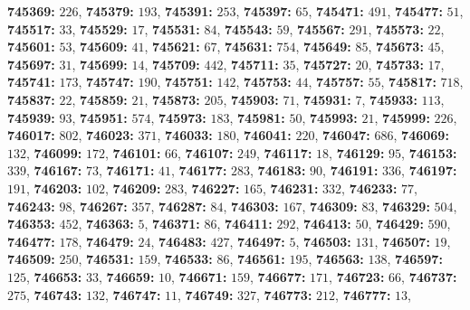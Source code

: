 \textsf{\bfseries 745369:} $226$, \textsf{\bfseries 745379:} $193$, \textsf{\bfseries 745391:} $253$, \textsf{\bfseries 745397:} $65$, \textsf{\bfseries 745471:} $491$, \textsf{\bfseries 745477:} $51$, \textsf{\bfseries 745517:} $33$, \textsf{\bfseries 745529:} $17$, \textsf{\bfseries 745531:} $84$, \textsf{\bfseries 745543:} $59$, \textsf{\bfseries 745567:} $291$, \textsf{\bfseries 745573:} $22$, \textsf{\bfseries 745601:} $53$, \textsf{\bfseries 745609:} $41$, \textsf{\bfseries 745621:} $67$, \textsf{\bfseries 745631:} $754$, \textsf{\bfseries 745649:} $85$, \textsf{\bfseries 745673:} $45$, \textsf{\bfseries 745697:} $31$, \textsf{\bfseries 745699:} $14$, \textsf{\bfseries 745709:} $442$, \textsf{\bfseries 745711:} $35$, \textsf{\bfseries 745727:} $20$, \textsf{\bfseries 745733:} $17$, \textsf{\bfseries 745741:} $173$, \textsf{\bfseries 745747:} $190$, \textsf{\bfseries 745751:} $142$, \textsf{\bfseries 745753:} $44$, \textsf{\bfseries 745757:} $55$, \textsf{\bfseries 745817:} $718$, \textsf{\bfseries 745837:} $22$, \textsf{\bfseries 745859:} $21$, \textsf{\bfseries 745873:} $205$, \textsf{\bfseries 745903:} $71$, \textsf{\bfseries 745931:} $7$, \textsf{\bfseries 745933:} $113$, \textsf{\bfseries 745939:} $93$, \textsf{\bfseries 745951:} $574$, \textsf{\bfseries 745973:} $183$, \textsf{\bfseries 745981:} $50$, \textsf{\bfseries 745993:} $21$, \textsf{\bfseries 745999:} $226$, \textsf{\bfseries 746017:} $802$, \textsf{\bfseries 746023:} $371$, \textsf{\bfseries 746033:} $180$, \textsf{\bfseries 746041:} $220$, \textsf{\bfseries 746047:} $686$, \textsf{\bfseries 746069:} $132$, \textsf{\bfseries 746099:} $172$, \textsf{\bfseries 746101:} $66$, \textsf{\bfseries 746107:} $249$, \textsf{\bfseries 746117:} $18$, \textsf{\bfseries 746129:} $95$, \textsf{\bfseries 746153:} $339$, \textsf{\bfseries 746167:} $73$, \textsf{\bfseries 746171:} $41$, \textsf{\bfseries 746177:} $283$, \textsf{\bfseries 746183:} $90$, \textsf{\bfseries 746191:} $336$, \textsf{\bfseries 746197:} $191$, \textsf{\bfseries 746203:} $102$, \textsf{\bfseries 746209:} $283$, \textsf{\bfseries 746227:} $165$, \textsf{\bfseries 746231:} $332$, \textsf{\bfseries 746233:} $77$, \textsf{\bfseries 746243:} $98$, \textsf{\bfseries 746267:} $357$, \textsf{\bfseries 746287:} $84$, \textsf{\bfseries 746303:} $167$, \textsf{\bfseries 746309:} $83$, \textsf{\bfseries 746329:} $504$, \textsf{\bfseries 746353:} $452$, \textsf{\bfseries 746363:} $5$, \textsf{\bfseries 746371:} $86$, \textsf{\bfseries 746411:} $292$, \textsf{\bfseries 746413:} $50$, \textsf{\bfseries 746429:} $590$, \textsf{\bfseries 746477:} $178$, \textsf{\bfseries 746479:} $24$, \textsf{\bfseries 746483:} $427$, \textsf{\bfseries 746497:} $5$, \textsf{\bfseries 746503:} $131$, \textsf{\bfseries 746507:} $19$, \textsf{\bfseries 746509:} $250$, \textsf{\bfseries 746531:} $159$, \textsf{\bfseries 746533:} $86$, \textsf{\bfseries 746561:} $195$, \textsf{\bfseries 746563:} $138$, \textsf{\bfseries 746597:} $125$, \textsf{\bfseries 746653:} $33$, \textsf{\bfseries 746659:} $10$, \textsf{\bfseries 746671:} $159$, \textsf{\bfseries 746677:} $171$, \textsf{\bfseries 746723:} $66$, \textsf{\bfseries 746737:} $275$, \textsf{\bfseries 746743:} $132$, \textsf{\bfseries 746747:} $11$, \textsf{\bfseries 746749:} $327$, \textsf{\bfseries 746773:} $212$, \textsf{\bfseries 746777:} $13$, 
